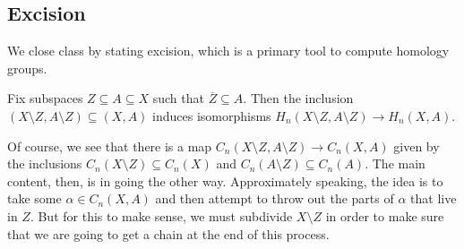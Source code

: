 \documentclass[../notes.tex]{subfiles}
\begin{document}
\subsection{Excision}
We close class by stating excision, which is a primary tool to compute homology groups.
\begin{theorem}[excision]
	Fix subspaces $Z\subseteq A\subseteq X$ such that $\overline Z\subseteq A$. Then the inclusion $(X\setminus Z,A\setminus Z)\subseteq (X,A)$ induces isomorphisms $H_n(X\setminus Z,A\setminus Z)\to H_n(X,A)$.
\end{theorem}
Of course, we see that there is a map $C_n(X\setminus Z,A\setminus Z)\to C_n(X,A)$ given by the inclusions $C_n(X\setminus Z)\subseteq C_n(X)$ and $C_n(A\setminus Z)\subseteq C_n(A)$. The main content, then, is in going the other way. Approximately speaking, the idea is to take some $\alpha\in C_n(X,A)$ and then attempt to throw out the parts of $\alpha$ that live in $Z$. But for this to make sense, we must subdivide $X\setminus Z$ in order to make sure that we are going to get a chain at the end of this process.
\end{document}
